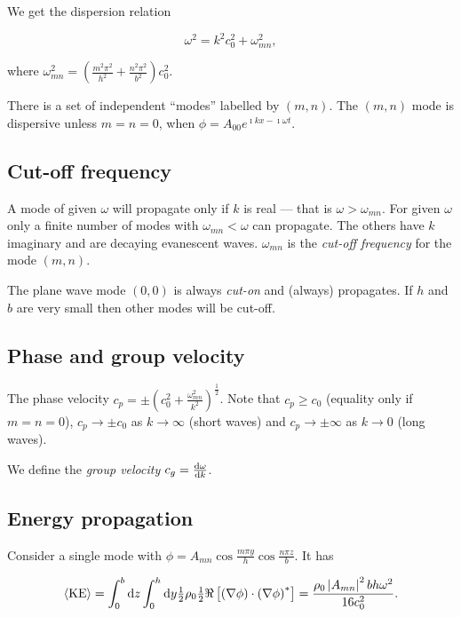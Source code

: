 \documentclass{notes}
\begin{document}
We get the dispersion relation

\begin{equation}\label{eq:disp:ductdisp}
\omega^2 = k^2 c_0^2 + \omega_{mn}^2,
\end{equation}

where $\omega_{mn}^2 = \left( \frac{m^2 \pi^2}{h^2} + \frac{n^2
    \pi^2}{b^2}\right) c_0^2$.

There is a set of independent ``modes'' labelled by $(m,n)$.
The $(m,n)$ mode is dispersive unless $m=n=0$, when
$\phi = A_{00} e^{\imath k x - \imath \omega t}$.

\subsection{Cut-off frequency}

A mode of given $\omega$ will propagate only if $k$ is real ---
that is $\omega > \omega_{mn}$.  For given $\omega$ only a finite
number of modes with $\omega_{mn} < \omega$ can propagate.  The others
have $k$ imaginary and are decaying evanescent waves.  $\omega_{mn}$
is the \emph{cut-off frequency} for the mode $(m,n)$.

The plane wave mode $(0,0)$ is always \emph{cut-on} and
(always) propagates.   If $h$ and $b$ are very small then other modes
will be cut-off.

\subsection{Phase and group velocity}

The phase velocity $c_p = \pm \left( c_0^2 + \frac{\omega_{mn}^2}{k^2}
\right)^{\frac{1}{2}}$.  Note that $c_p \ge c_0$ (equality only
if $m=n=0$), $c_p \to \pm c_0$ as $k \to \infty$ (short waves)
and $c_p \to \pm \infty$ as $k \to 0$ (long waves).

We define the \emph{group velocity}
$c_g = \frac{\mathrm{d}\omega}{\mathrm{d} k}$.

\subsection{Energy propagation}

Consider a single mode with $\phi = A_{mn} \cos \tfrac{m \pi y}{h}
\cos \tfrac{n \pi z}{b}$.  It has

\[
\langle \text{KE} \rangle = \int_0^b \mathrm{d} z \int_0^h \mathrm{d} y
\tfrac{1}{2} \rho_0 \tfrac{1}{2} \Re \left[ \left(\nabla \phi\right) \cdot
\left(\nabla \phi\right)^\ast\right]
= \frac{\rho_0 \left|A_{mn}\right|^2 b h \omega^2}{16 c_0^2}.
\]
\end{document}
